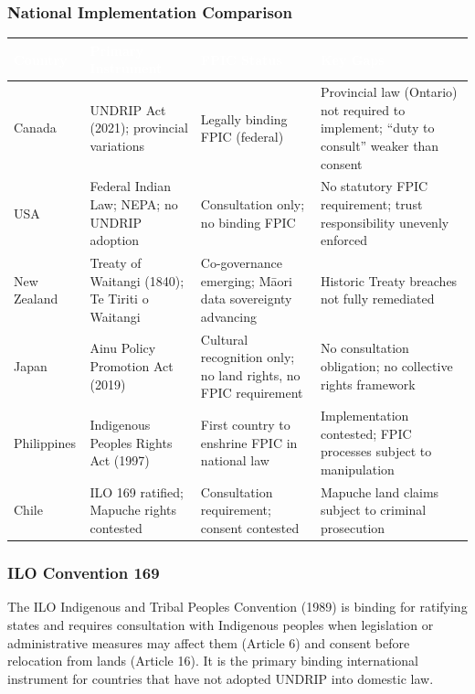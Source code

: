 \documentclass[11pt,letterpaper]{article}
\newcommand{\tableheader}[1]{\textbf{\sffamily\textcolor{white}{#1}}}
\begin{document}
\subsubsection{National Implementation Comparison}

\begin{center}
\begin{tabularx}{\textwidth}{L{2.5cm}L{3cm}L{3cm}X}
\toprule
{}
\tableheader{Country} & \tableheader{Primary Instrument} & \tableheader{FPIC Status} & \tableheader{Key Gaps} \\
\midrule
Canada & UNDRIP Act (2021); provincial variations & Legally binding FPIC (federal) & Provincial law (Ontario) not required to implement; ``duty to consult'' weaker than consent \\
USA & Federal Indian Law; NEPA; no UNDRIP adoption & Consultation only; no binding FPIC & No statutory FPIC requirement; trust responsibility unevenly enforced \\
New Zealand & Treaty of Waitangi (1840); Te Tiriti o Waitangi & Co-governance emerging; Māori data sovereignty advancing & Historic Treaty breaches not fully remediated \\
Japan & Ainu Policy Promotion Act (2019) & Cultural recognition only; no land rights, no FPIC requirement & No consultation obligation; no collective rights framework \\
Philippines & Indigenous Peoples Rights Act (1997) & First country to enshrine FPIC in national law & Implementation contested; FPIC processes subject to manipulation \\
Chile & ILO 169 ratified; Mapuche rights contested & Consultation requirement; consent contested & Mapuche land claims subject to criminal prosecution \\
\bottomrule
\end{tabularx}
\end{center}

\subsubsection{ILO Convention 169}

The ILO Indigenous and Tribal Peoples Convention (1989) is binding for ratifying states and requires consultation with Indigenous peoples when legislation or administrative measures may affect them (Article 6) and consent before relocation from lands (Article 16). It is the primary binding international instrument for countries that have not adopted UNDRIP into domestic law.
\end{document}
